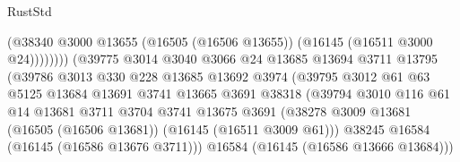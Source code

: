 \begin{lexlean}{RustStd}
\begin{coremodule}
                                            (@38340
                                              @3000
                                              @13655
                                              (@16505 (@16506 @13655))
                                              (@16145 (@16511 @3000 @24))))))))
                                  (@39775
                                    @3014
                                    @3040
                                    @3066
                                    @24
                                    @13685
                                    @13694
                                    @3711
                                    @13795
                                    (@39786
                                      @3013
                                      @330
                                      @228
                                      @13685
                                      @13692
                                      @3974
                                      (@39795
                                        @3012
                                        @61
                                        @63
                                        @5125
                                        @13684
                                        @13691
                                        @3741
                                        @13665
                                        @3691
                                        @38318
                                        (@39794
                                          @3010
                                          @116
                                          @61
                                          @14
                                          @13681
                                          @3711
                                          @3704
                                          @3741
                                          @13675
                                          @3691
                                          (@38278
                                            @3009
                                            @13681
                                            (@16505 (@16506 @13681))
                                            (@16145 (@16511 @3009 @61)))
                                          @38245
                                          @16584
                                          (@16145 (@16586 @13676 @3711)))
                                        @16584
                                        (@16145 (@16586 @13666 @13684)))

\end{coremodule}
\end{lexlean}
